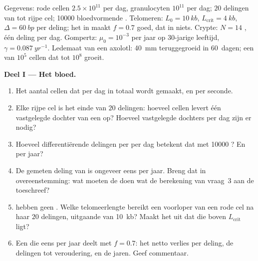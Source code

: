 \begin{problem}
\label{pb:b3:stem-cells:1}
Gegevens: rode cellen $2.5\times 10^{11}$ per dag, granulocyten
$10^{11}$ per dag; $20$ delingen van  tot rijpe cel; \num{10000}
bloedvormende . Telomeren: $L_{0} = \qty{10}{kb}$,
$L_{\text{crit}} = \qty{4}{kb}$, $\Delta = \qty{60}{bp}$ per deling;
het  in  maakt $f = 0.7$ goed, dat in
 niets. Crypte: $N = 14$ , één deling per dag.
Gompertz: $\mu_{0} =
10^{-3}$ per jaar op 30-jarige leeftijd, $\gamma = \qty{0.087}{yr^{-1}}$.
Ledemaat van een axolotl: \qty{40}{mm} teruggegroeid in \qty{60}{dagen};
een  van $10^{5}$ cellen dat tot $10^{8}$ groeit.

\medskip
\noindent\textbf{Deel I --- Het bloed.}
\begin{enumerate}
  \item Het aantal cellen dat per dag in totaal wordt gemaakt, en per seconde.
  \item Elke rijpe cel is het einde van $20$ delingen: hoeveel cellen
        levert één vastgelegde dochter van een  op? Hoeveel
        vastgelegde dochters per dag zijn er nodig?
  \item Hoeveel differentiërende delingen per  per dag betekent
        dat met \num{10000} ? En per jaar?
  \item De gemeten deling van  is ongeveer eens per jaar.
        Breng dat in overeenstemming: wat moeten de 
        doen wat de berekening van vraag~3 aan de  toeschreef?
  \item {} hebben geen . Welke telomeerlengte
        bereikt een voorloper van een rode cel na haar $20$ delingen,
        uitgaande van \qty{10}{kb}? Maakt het uit dat die boven
        $L_{\text{crit}}$ ligt?
  \item Een  die eens per jaar deelt met $f = 0.7$: het netto
        verlies per deling, de delingen tot veroudering, en de jaren.
        Geef commentaar.
\end{enumerate}


\end{problem}
